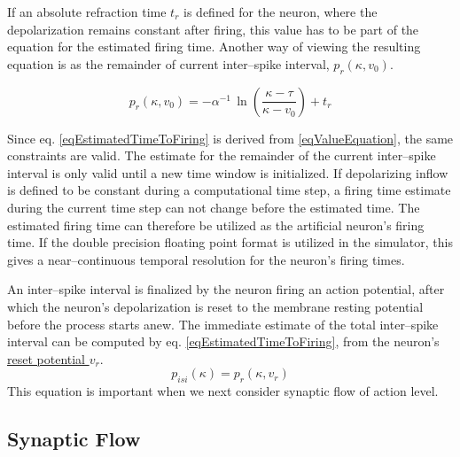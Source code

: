 	If an absolute refraction time $t_r$ is defined for the neuron, where the depolarization remains constant after firing, this value has to be part of the equation for the estimated firing time.
	Another way of viewing the resulting equation is as the remainder of current inter--spike interval, $p_r(\kappa, v_0)$.

\begin{equation}
	p_r(\kappa, v_0)  	= -\alpha^{-1} \, \ln \left( \frac{\kappa - \tau}{\kappa - v_0} \right) + t_r
	\label{eqEstimatedTimeToFiring}
\end{equation}

	Since eq. \eqref{eqEstimatedTimeToFiring} is derived from \eqref{eqValueEquation}, the same constraints are valid.
	The estimate for the remainder of the current inter--spike interval is only valid until a new time window is initialized.
	If depolarizing inflow is defined to be constant during a computational time step, a firing time estimate during the current time step can not change before the estimated time. %
	The estimated firing time can therefore be utilized as the artificial neuron's firing time. %
	If the double precision floating point format is utilized in the simulator, this gives a near--continuous temporal resolution for the neuron's firing times.


	An inter--spike interval is finalized by the neuron firing an action potential, after which the neuron's depolarization is reset to the membrane resting potential before the process starts anew.
	The immediate estimate of the total inter--spike interval can be computed by eq. \eqref{eqEstimatedTimeToFiring}, from the neuron's \underline{reset potential $v_r$}.
\begin{equation}
	p_{isi}(\kappa) = p_r(\kappa, v_r)%
	\label{eqEstimateOfInterSpikePeriod}
\end{equation}
 	This equation is important when we next consider synaptic flow of action level.
	


    \subsection{Synaptic Flow}
	\label{ssecSynapticFlow}


